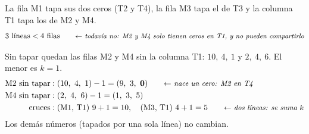 \documentclass[11pt,a4paper]{article}
\newcommand{\marco}[3]{%
  \foreach \i in {2,...,#2} \foreach \j in {2,...,#3}
    \draw[gray!60, very thin] (#1-\i-\j.north west) rectangle (#1-\i-\j.south east);
  \draw[semithick] (#1-2-2.north west) rectangle (#1-#2-#3.south east);}
\newcommand{\tfila}[3]{\draw[tapa] (#1-#2-2.west) -- (#1-#2-#3.east);}
\newcommand{\tcol}[3]{\draw[tapa] (#1-2-#2.north) -- (#1-#3-#2.south);}
\newcommand{\pie}[2]{\node[below=1.5mm of #1, font=\scriptsize\itshape] {#2};}
\newcommand{\flecha}[3]{\draw[-{Stealth[length=2.4mm]}, thick] (#1.east) -- node[above, font=\scriptsize, align=center] {#3} (#1.east -| #2.west);}
\begin{document}
\begin{center}
\end{center}
La fila M1 tapa sus dos ceros (T2 y T4), la fila M3 tapa el de T3 y la columna T1 tapa los de M2 y M4.
\[
3 \text{ líneas} < 4 \text{ filas} \nota{todavía no: M2 y M4 solo tienen ceros en T1, y no pueden compartirlo}
\]

Sin tapar quedan las filas M2 y M4 sin la columna T1: $10,\ 4,\ 1$ y $2,\ 4,\ 6$. El menor es $k = 1$.
\begin{align*}
\text{M2 sin tapar} &: (10,\ 4,\ 1) - 1 = (9,\ 3,\ \mathbf{0}) \nota{nace un cero: M2 en T4}\\
\text{M4 sin tapar} &: (2,\ 4,\ 6) - 1 = (1,\ 3,\ 5)\\
\text{cruces} &: (\text{M1, T1})\ 9 + 1 = 10, \quad (\text{M3, T1})\ 4 + 1 = 5 \nota{dos líneas: se suma $k$}
\end{align*}
Los demás números (tapados por una sola línea) no cambian.
\end{document}
